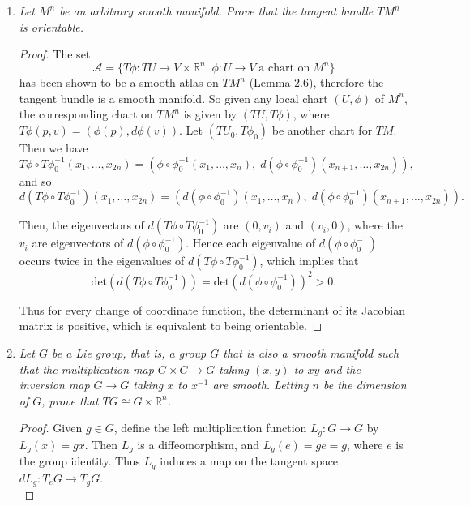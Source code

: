 \documentclass{article}
\begin{document}
\begin{enumerate}[label={\bf Q\arabic*:}]
    \begin{proof}
    \end{proof}

  \item \it Let $M^n$ be an arbitrary smooth manifold. Prove that the tangent
    bundle $TM^n$ is orientable.

    \begin{proof}
      The set 
      \[\mathcal{A} = \{T\phi:TU\rightarrow V\times\mathbb{R}^n|\;
        \phi:U\rightarrow V\; \text{a chart on}\; M^n\}\]
      has been shown to be a smooth atlas on $TM^n$ (Lemma 2.6), therefore
      the tangent bundle is a smooth manifold. So given any local chart
      $(U,\phi)$ of $M^n$, the corresponding chart on $TM^n$ is given by
      $(TU,T\phi)$, where $T\phi(p,v)=(\phi(p),d\phi(v))$. Let
      $(TU_0,T\phi_0)$ be another chart for $TM$. Then we have
      \[T\phi\circ T\phi_0^{-1}(x_1,\ldots,x_{2n})
        =(\phi\circ\phi_0^{-1}(x_1,\ldots,x_n),\; d(\phi\circ\phi_0^{-1})
        (x_{n+1},\ldots,x_{2n})),\]
      and so
      \[d(T\phi\circ T\phi_0^{-1})(x_{1},\ldots,x_{2n})
        =(d(\phi\circ\phi_0^{-1})(x_{1},\ldots,x_{n}),\;
        d(\phi\circ\phi_0^{-1})(x_{n+1},\ldots,x_{2n})).\]

      Then, the eigenvectors of $d(T\phi\circ T\phi_0^{-1})$ are $(0,v_i)$
      and $(v_i,0)$, where the $v_i$ are eigenvectors of
      $d(\phi\circ\phi_0^{-1})$. Hence each eigenvalue of
      $d(\phi\circ\phi_0^{-1})$ occurs twice in the eigenvalues of
      $d(T\phi\circ T\phi_0^{-1})$, which implies that
      \[\text{det}(d(T\phi\circ T\phi_0^{-1}))
      =\text{det}(d(\phi\circ\phi_0^{-1}))^2 >0.\]

      Thus for every change of coordinate function, the determinant of its
      Jacobian matrix is positive, which is equivalent to being orientable.
    \end{proof}

  \item \it Let $G$ be a Lie group, that is, a group $G$ that is also a
    smooth manifold such that the multiplication map $G\times G\rightarrow
    G$ taking $(x,y)$ to $xy$ and the inversion map $G\rightarrow G$ taking
    $x$ to $x^{-1}$ are smooth. Letting $n$ be the dimension of $G$, prove
    that $TG\cong G\times\mathbb{R}^n$.

    \begin{proof}
      Given $g\in G$, define the left multiplication function
      $L_g:G\rightarrow G$ by $L_g(x)=gx$. Then $L_g$ is a diffeomorphism,
      and $L_g(e)=ge=g$, where $e$ is the group identity. Thus $L_g$
      induces a map on the tangent space $dL_g:T_eG\rightarrow T_gG$.  \\


\end{proof}
\end{enumerate}
\end{document}
